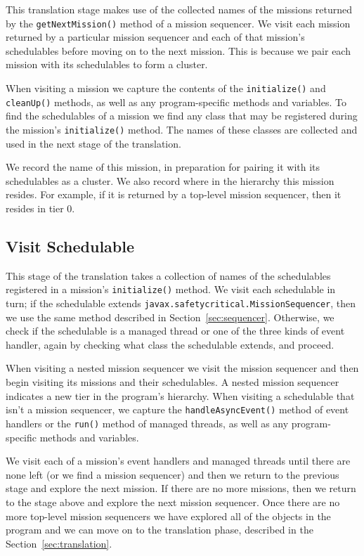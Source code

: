 \documentclass[10pt,a4paper]{article}
\begin{document}
This translation stage makes use of the collected names of the missions returned by the \texttt{getNextMission()} method of a mission sequencer. We visit each mission returned by a particular mission sequencer and each of that mission's schedulables before moving on to the next mission. This is because we pair each mission with its schedulables to form a cluster. 

When visiting a mission we capture the contents of the \texttt{initialize()} and \texttt{cleanUp()} methods, as well as any program-specific methods and variables. To find the schedulables of a mission we find any class that may be registered during the mission's \texttt{initialize()} method. The names of these classes are collected and used in the next stage of the translation. 

We record the name of this mission, in preparation for pairing it with its schedulables as a cluster. We also record where in the hierarchy this mission resides. For example, if it is returned by a top-level mission sequencer, then it resides in tier 0. 

\subsection{Visit Schedulable}
\label{sec:schedulables}

This stage of the translation takes a collection of names of the schedulables registered in a mission's \texttt{initialize()} method. We visit each schedulable in turn; if the schedulable extends \texttt{javax.safetycritical.MissionSequencer}, then we use the same method described in Section~\ref{sec:sequencer}. Otherwise, we check if the schedulable is a managed thread or one of the three kinds of event handler, again by checking what class the schedulable extends, and proceed.


When visiting a nested mission sequencer we visit the mission sequencer and then begin visiting its missions and their schedulables. A nested mission sequencer indicates a new tier in the program's hierarchy. When visiting a schedulable that isn't a mission sequencer, we capture the \texttt{handleAsyncEvent()} method of event handlers or the \texttt{run()} method of managed threads, as well as any program-specific methods and variables. 

We visit each of a mission's event handlers and managed threads until there are none left (or we find a mission sequencer) and then we return to the previous stage and explore the next mission. If there are no more missions, then we return to the stage above and explore the next mission sequencer. Once there are no more top-level mission sequencers we have explored all of the objects in the program and we can move on to the translation phase, described in the Section~\ref{sec:translation}.
\end{document}
